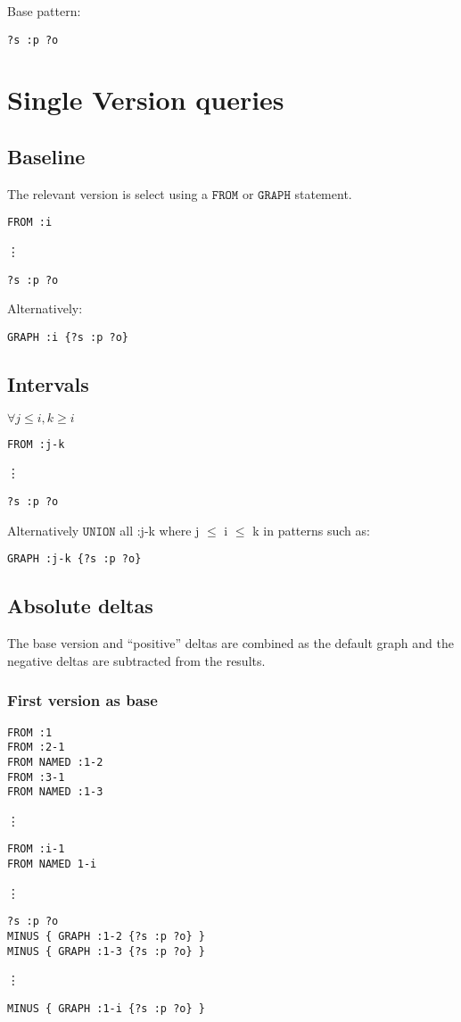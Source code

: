 Base pattern:
\begin{verbatim}
?s :p ?o
\end{verbatim}

\section{Single Version queries}
\subsection{Baseline}
The relevant version is select using a $\mathtt{FROM}$ or $\mathtt{GRAPH}$ statement.
\begin{verbatim}
FROM :i
\end{verbatim}
\vdots
\begin{verbatim}
?s :p ?o
\end{verbatim}
Alternatively:
\begin{verbatim}
GRAPH :i {?s :p ?o}
\end{verbatim}


\subsection{Intervals}
$\forall j \leq i, k \geq i$
\begin{verbatim}
FROM :j-k
\end{verbatim}
\vdots
\begin{verbatim}
?s :p ?o
\end{verbatim}
Alternatively $\mathtt{UNION}$ all :j-k where j $\leq$ i $\leq$ k in patterns such as:
\begin{verbatim}
GRAPH :j-k {?s :p ?o}
\end{verbatim}
\subsection{Absolute deltas}
The base version and ``positive'' deltas are combined as the default graph and the negative deltas are subtracted from the results.
\subsubsection{First version as base}
\begin{verbatim}
FROM :1
FROM :2-1
FROM NAMED :1-2
FROM :3-1
FROM NAMED :1-3
\end{verbatim}
\vdots
\begin{verbatim}
FROM :i-1
FROM NAMED 1-i
\end{verbatim}
\vdots
\begin{verbatim}
?s :p ?o
MINUS { GRAPH :1-2 {?s :p ?o} }
MINUS { GRAPH :1-3 {?s :p ?o} }
\end{verbatim}
\vdots
\begin{verbatim}
MINUS { GRAPH :1-i {?s :p ?o} }
\end{verbatim}

